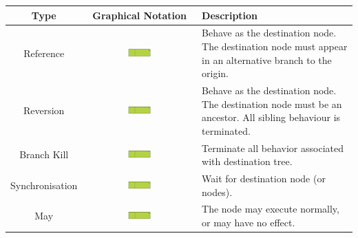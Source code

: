 \documentclass[]{article}
\begin{document}
\begin{landscape}
\singlespacing
\begin{center}
\begin{tabular}[c]{|c|c|p{12cm}|}\hline
\textbf{Type} & \textbf{Graphical Notation} & \textbf{Description} \\ 
\hline
\hline
\multirow{3}{*}{Reference} & \multirow{3}{*}{\includegraphics[width=0.23\textwidth]{figs/AppendixB/Operators/Reference.pdf}} & \multirow{3}{12cm}{Behave as the destination node. The destination node must appear in an alternative branch to the origin.} \\
&&\\
&&\\
\hline
 \multirow{3}{*}{Reversion} & \multirow{3}{*}{\includegraphics[width=0.23\textwidth]{figs/AppendixB/Operators/Reversion.pdf}} & \multirow{3}{12cm}{Behave as the destination node. The destination node must be an ancestor. All sibling behaviour is terminated.} \\
&&\\
&&\\
 \hline
 \multirow{3}{*}{Branch Kill} & \multirow{3}{*}{\includegraphics[width=0.23\textwidth]{figs/AppendixB/Operators/BranchKill.pdf}} & \multirow{3}{12cm}{Terminate all behavior associated with destination tree.}\\
&&\\
&&\\
 \hline
 \multirow{3}{*}{Synchronisation} & \multirow{3}{*}{\includegraphics[width=0.23\textwidth]{figs/AppendixB/Operators/Synchronisation.pdf}} & \multirow{3}{12cm}{Wait for destination node (or nodes).}\\
&&\\
&&\\
 \hline
 \multirow{3}{*}{May} & \multirow{3}{*}{\includegraphics[width=0.23\textwidth]{figs/AppendixB/Operators/May.pdf}} & \multirow{3}{12cm}{The node may execute normally, or may have no effect.}\\

\end{tabular}
\end{center}
\end{landscape}
\end{document}
